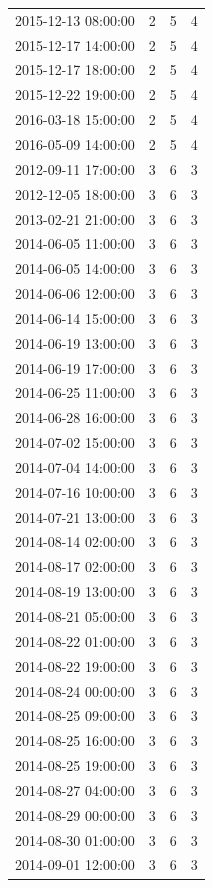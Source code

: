 \begin{tabular}{lrrr}
2015-12-13 08:00:00 & 2 & 5 & 4 \\
2015-12-17 14:00:00 & 2 & 5 & 4 \\
2015-12-17 18:00:00 & 2 & 5 & 4 \\
2015-12-22 19:00:00 & 2 & 5 & 4 \\
2016-03-18 15:00:00 & 2 & 5 & 4 \\
2016-05-09 14:00:00 & 2 & 5 & 4 \\
2012-09-11 17:00:00 & 3 & 6 & 3 \\
2012-12-05 18:00:00 & 3 & 6 & 3 \\
2013-02-21 21:00:00 & 3 & 6 & 3 \\
2014-06-05 11:00:00 & 3 & 6 & 3 \\
2014-06-05 14:00:00 & 3 & 6 & 3 \\
2014-06-06 12:00:00 & 3 & 6 & 3 \\
2014-06-14 15:00:00 & 3 & 6 & 3 \\
2014-06-19 13:00:00 & 3 & 6 & 3 \\
2014-06-19 17:00:00 & 3 & 6 & 3 \\
2014-06-25 11:00:00 & 3 & 6 & 3 \\
2014-06-28 16:00:00 & 3 & 6 & 3 \\
2014-07-02 15:00:00 & 3 & 6 & 3 \\
2014-07-04 14:00:00 & 3 & 6 & 3 \\
2014-07-16 10:00:00 & 3 & 6 & 3 \\
2014-07-21 13:00:00 & 3 & 6 & 3 \\
2014-08-14 02:00:00 & 3 & 6 & 3 \\
2014-08-17 02:00:00 & 3 & 6 & 3 \\
2014-08-19 13:00:00 & 3 & 6 & 3 \\
2014-08-21 05:00:00 & 3 & 6 & 3 \\
2014-08-22 01:00:00 & 3 & 6 & 3 \\
2014-08-22 19:00:00 & 3 & 6 & 3 \\
2014-08-24 00:00:00 & 3 & 6 & 3 \\
2014-08-25 09:00:00 & 3 & 6 & 3 \\
2014-08-25 16:00:00 & 3 & 6 & 3 \\
2014-08-25 19:00:00 & 3 & 6 & 3 \\
2014-08-27 04:00:00 & 3 & 6 & 3 \\
2014-08-29 00:00:00 & 3 & 6 & 3 \\
2014-08-30 01:00:00 & 3 & 6 & 3 \\
2014-09-01 12:00:00 & 3 & 6 & 3 \\

\end{tabular}
